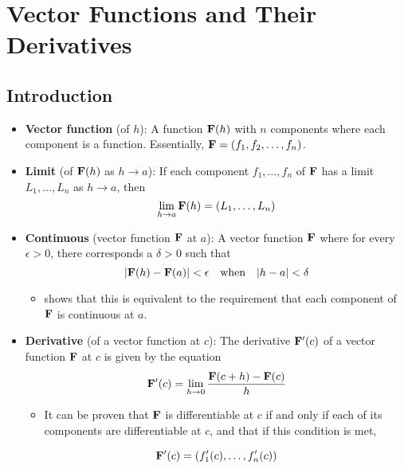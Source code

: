 \documentclass[../main.tex]{subfiles}
\begin{document}
\chapter{Vector Functions and Their Derivatives}
\section{Introduction}
\begin{itemize}
    \item {}\textbf{Vector function} (of $h$): A function $\vb{F}(h)$ with $n$ components where each component is a function. Essentially, $\vb{F}=(f_1,f_2,\dots,f_n)$.
    \item \textbf{Limit} (of $\vb{F}(h)$ as $h\to a$): If each component $f_1,\dots,f_n$ of $\vb{F}$ has a limit $L_1,\dots,L_n$ as $h\to a$, then
    \begin{equation*}
        \lim_{h\to a}\vb{F}(h) = (L_1,\dots,L_n)
    \end{equation*}
    \item \textbf{Continuous} (vector function $\vb{F}$ at $a$): A vector function $\vb{F}$ where for every $\epsilon>0$, there corresponds a $\delta>0$ such that
    \begin{equation*}
        |\vb{F}(h)-\vb{F}(a)|<\epsilon\quad\text{when}\quad|h-a|<\delta
    \end{equation*}
    \begin{itemize}
        \item \cite{bib:Thomas} shows that this is equivalent to the requirement that each component of $\vb{F}$ is continuous at $a$.
    \end{itemize}
    \item \textbf{Derivative} (of a vector function at $c$): The derivative $\vb{F}'(c)$ of a vector function $\vb{F}$ at $c$ is given by the equation
    \begin{equation*}
        \vb{F}'(c) = \lim_{h\to 0}\frac{\vb{F}(c+h)-\vb{F}(c)}{h}
    \end{equation*}
    \begin{itemize}
        \item It can be proven that $\vb{F}$ is differentiable at $c$ if and only if each of its components are differentiable at $c$, and that if this condition is met,
    \end{itemize}
    \begin{equation*}
        \vb{F}'(c) = (f_1'(c),\dots,f_n'(c))
    \end{equation*}
\end{itemize}
\end{document}
